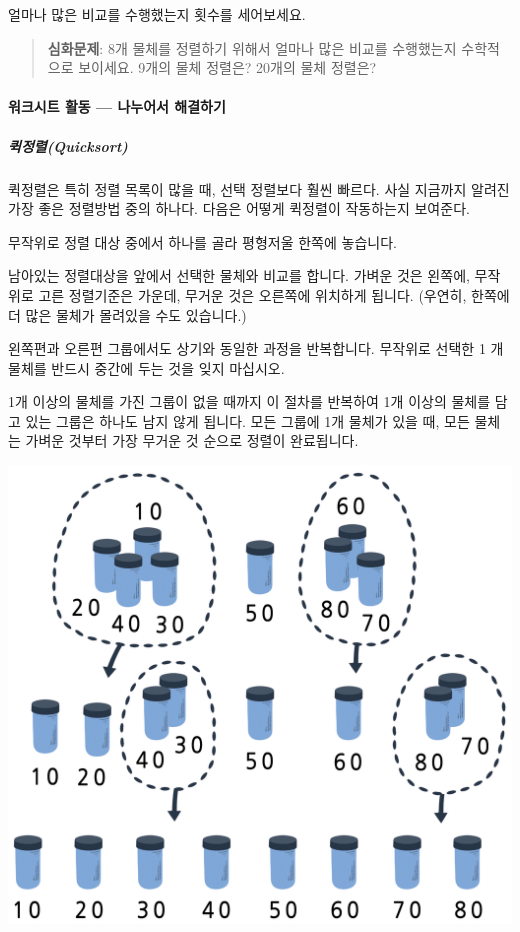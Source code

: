 \documentclass[]{article}
\begin{document}
얼마나 많은 비교를 수행했는지 횟수를 세어보세요.

\begin{quote}
\textbf{심화문제}: 8개 물체를 정렬하기 위해서 얼마나 많은 비교를
수행했는지 수학적으로 보이세요. 9개의 물체 정렬은? 20개의 물체 정렬은?
\end{quote}

\mbox{}\paragraph{워크시트 활동 --- 나누어서 해결하기}\label{mdash---1}

\subparagraph{퀵정렬(Quicksort)}\label{quicksort}

퀵정렬은 특히 정렬 목록이 많을 때, 선택 정렬보다 훨씬 빠르다. 사실
지금까지 알려진 가장 좋은 정렬방법 중의 하나다. 다음은 어떻게 퀵정렬이
작동하는지 보여준다.

무작위로 정렬 대상 중에서 하나를 골라 평형저울 한쪽에 놓습니다.

남아있는 정렬대상을 앞에서 선택한 물체와 비교를 합니다. 가벼운 것은
왼쪽에, 무작위로 고른 정렬기준은 가운데, 무거운 것은 오른쪽에 위치하게
됩니다. (우연히, 한쪽에 더 많은 물체가 몰려있을 수도 있습니다.)

왼쪽편과 오른편 그룹에서도 상기와 동일한 과정을 반복합니다. 무작위로
선택한 1 개 물체를 반드시 중간에 두는 것을 잊지 마십시오.

1개 이상의 물체를 가진 그룹이 없을 때까지 이 절차를 반복하여 1개 이상의
물체를 담고 있는 그룹은 하나도 남지 않게 됩니다. 모든 그룹에 1개 물체가
있을 때, 모든 물체는 가벼운 것부터 가장 무거운 것 순으로 정렬이
완료됩니다.

\includegraphics{csunplugged/02-part/img/ch07-sort/07-sort-02-quick.png}
\end{document}
